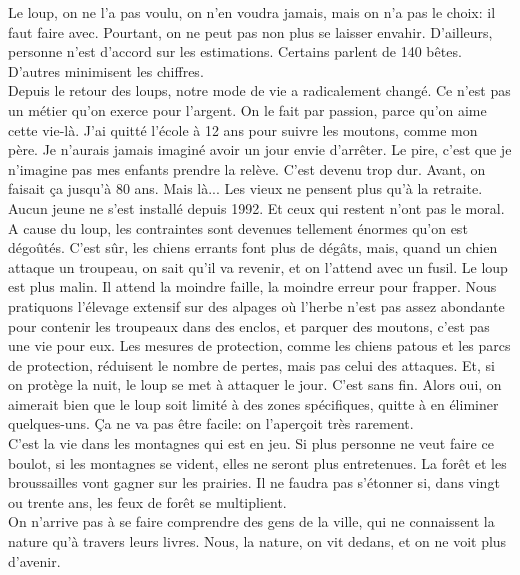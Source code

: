 \documentclass[8pt]{article}
\begin{document}
Le loup, on ne l'a pas voulu, on n'en voudra jamais, mais on n'a pas le choix: il faut faire avec. Pourtant, on ne peut pas non plus se laisser envahir. D'ailleurs, personne n'est d'accord sur les estimations. Certains parlent de 140 bêtes. D'autres minimisent les chiffres.  \\

Depuis le retour des loups, notre mode de vie a radicalement changé. Ce n'est pas un métier qu'on exerce pour l'argent. On le fait par passion, parce qu'on aime cette vie-là. J'ai quitté l'école à 12 ans pour suivre les moutons, comme mon père. Je n'aurais jamais imaginé avoir un jour envie d'arrêter. Le pire, c'est que je n'imagine pas mes enfants prendre la relève. C'est devenu trop dur. Avant, on faisait ça jusqu'à 80 ans. Mais là... Les vieux ne pensent plus qu'à la retraite. Aucun jeune ne s'est installé depuis 1992. Et ceux qui restent n'ont pas le moral. \\

A cause du loup, les contraintes sont devenues tellement énormes qu'on est dégoûtés. C'est sûr, les chiens errants font plus de dégâts, mais, quand un chien attaque un troupeau, on sait qu'il va revenir, et on l'attend avec un fusil. Le loup est plus malin. Il attend la moindre faille, la moindre erreur pour frapper. Nous pratiquons l'élevage extensif sur des alpages où l'herbe n'est pas assez abondante pour contenir les troupeaux dans des enclos, et parquer des moutons, c'est pas une vie pour eux. Les mesures de protection, comme les chiens patous et les parcs de protection, réduisent le nombre de pertes, mais pas celui des attaques. Et, si on protège la nuit, le loup se met à attaquer le jour. C'est sans fin. Alors oui, on aimerait bien que le loup soit limité à des zones spécifiques, quitte à en éliminer quelques-uns. Ça ne va pas être facile: on l'aperçoit très rarement. \\

C'est la vie dans les montagnes qui est en jeu. Si plus personne ne veut faire ce boulot, si les montagnes se vident, elles ne seront plus entretenues. La forêt et les broussailles vont gagner sur les prairies. Il ne faudra pas s'étonner si, dans vingt ou trente ans, les feux de forêt se multiplient. \\

On n'arrive pas à se faire comprendre des gens de la ville, qui ne connaissent la nature qu'à travers leurs livres. Nous, la nature, on vit dedans, et on ne voit plus d'avenir. \\
\end{document}
